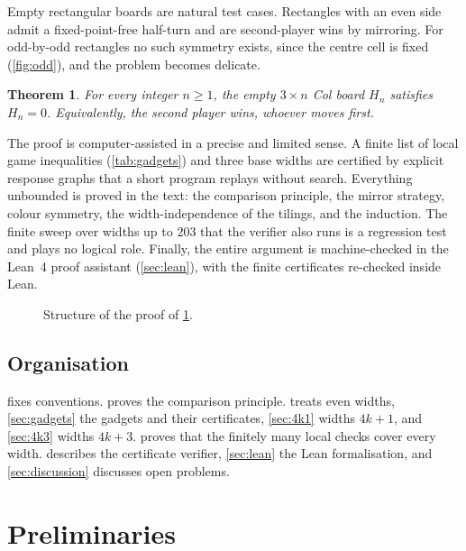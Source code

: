\documentclass[11pt]{amsart}
\newtheorem{theorem}{Theorem}[section]
\theoremstyle{definition}
\begin{document}
Empty rectangular boards are natural test cases. Rectangles with an even
side admit a fixed-point-free half-turn and are second-player wins by
mirroring. For odd-by-odd rectangles no such symmetry exists, since the centre
cell is fixed (\cref{fig:odd}), and the problem becomes delicate.

\begin{theorem}\label{thm:main}
For every integer $n\ge1$, the empty $3\times n$ Col board $H_n$ satisfies
$H_n=0$. Equivalently, the second player wins, whoever moves first.
\end{theorem}

The proof is computer-assisted in a precise and limited sense. A finite list of
local game inequalities (\cref{tab:gadgets}) and three base widths are
certified by explicit response graphs that a short program replays without
search. Everything unbounded is proved in the text: the comparison principle,
the mirror strategy, colour symmetry, the width-independence of the tilings,
and the induction. The finite sweep over widths up to $203$ that the verifier
also runs is a regression test and plays no logical role. Finally, the entire
argument is machine-checked in the Lean~4 proof assistant
(\cref{sec:lean}), with the finite certificates re-checked inside Lean.

\begin{figure}[ht]
\centering
{}
\caption{Structure of the proof of \cref{thm:main}.}
\label{fig:roadmap}
\end{figure}

\subsection*{Organisation}
 fixes conventions.  proves the
comparison principle.  treats even widths, \cref{sec:gadgets}
the gadgets and their certificates, \cref{sec:4k1} widths $4k+1$, and
\cref{sec:4k3} widths $4k+3$.  proves that the finitely
many local checks cover every width.  describes the
certificate verifier, \cref{sec:lean} the Lean formalisation, and
\cref{sec:discussion} discusses open problems.

\section{Preliminaries}\label{sec:prelim}
\end{document}
